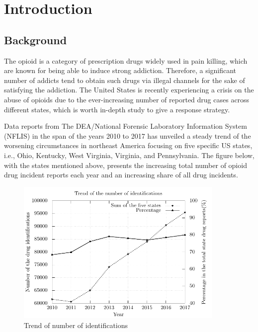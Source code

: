 \documentclass{mcmthesis}
\begin{document}
\tableofcontents

\newpage

\section{Introduction}
\subsection{Background}
The opioid is a category of prescription drugs widely used in pain killing, which are known for being able to induce strong addiction. Therefore, a significant number of addicts tend to obtain such drugs via illegal channels for the sake of satisfying the addiction. The United States is recently experiencing a crisis on the abuse of opioids due to the ever-increasing number of reported drug cases across different states, which is worth in-depth study to give a response strategy.

Data reports from The DEA/National Forensic Laboratory Information System (NFLIS) in the span of the years 2010 to 2017 has unveiled a steady trend of the worsening circumstances in northeast America focusing on five specific US states, i.e., Ohio, Kentucky, West Virginia, Virginia, and Pennsylvania. The figure below, with the states mentioned above, presents the increasing total number of opioid drug incident reports each year and an increasing share of all drug incidents.
\begin{figure}[htbp!]
  \centering
  \includegraphics[width=10cm]{FiveStates.pdf}
  \caption{Trend of number of identifications}\label{1}
\end{figure}
\end{document}
